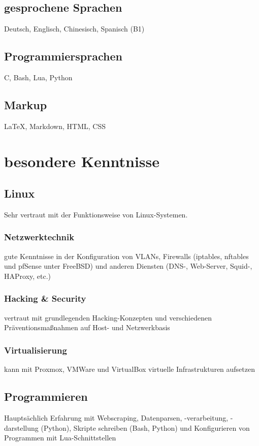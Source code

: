 \documentclass{article}
\begin{document}
\subsection{gesprochene Sprachen}
Deutsch, Englisch, Chinesisch, Spanisch (B1)

\subsection{Programmiersprachen}
C, Bash, Lua, Python

\subsection{Markup}
\LaTeX, Markdown, HTML, CSS

\section{besondere Kenntnisse}

\subsection{Linux}
Sehr vertraut mit der Funktionsweise von Linux-Systemen.

\subsubsection{Netzwerktechnik}
gute Kenntnisse in der Konfiguration von VLANs, Firewalls (iptables, nftables und pfSense unter FreeBSD) und anderen Diensten (DNS-, Web-Server, Squid-, HAProxy, etc.)

\subsubsection{Hacking \& Security}
vertraut mit grundlegenden Hacking-Konzepten und verschiedenen Präventionsmaßnahmen auf Host- und Netz\-werkbasis

\subsubsection{Virtualisierung}
kann mit Proxmox, VMWare und VirtualBox virtuelle Infrastrukturen aufsetzen

\subsection{Programmieren}
Hauptsächlich Erfahrung mit Webscraping, Datenparsen, -verarbeitung, -darstellung (Python), Skripte schreiben (Bash, Python) und Konfigurieren von Programmen mit Lua-Schnittstellen
\end{document}
